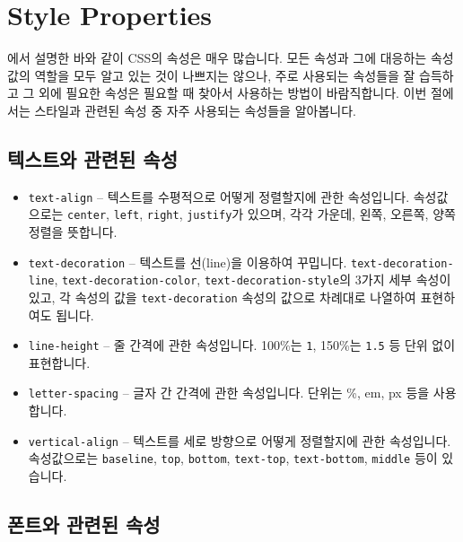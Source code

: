\section{Style Properties} \label{sect:style-properties}

에서 설명한 바와 같이 CSS의 속성은 매우 많습니다. 모든 속성과 그에 대응하는 속성값의 역할을 모두 알고 있는 것이 나쁘지는 않으나, 주로 사용되는 속성들을 잘 습득하고 그 외에 필요한 속성은 필요할 때 찾아서 사용하는 방법이 바람직합니다. 이번 절에서는 스타일과 관련된 속성 중 자주 사용되는 속성들을 알아봅니다. 

\subsection*{텍스트와 관련된 속성}

\begin{itemize}
    \item \verb|text-align| – 텍스트를 수평적으로 어떻게 정렬할지에 관한 속성입니다. 속성값으로는 \verb|center|, \verb|left|, \verb|right|, \verb|justify|가 있으며, 각각 가운데, 왼쪽, 오른쪽, 양쪽 정렬을 뜻합니다. 
    \item \verb|text-decoration| – 텍스트를 선(line)을 이용하여 꾸밉니다. \verb|text-decoration-line|, \verb|text-decoration-color|, \verb|text-decoration-style|의 3가지 세부 속성이 있고, 각 속성의 값을 \verb|text-decoration| 속성의 값으로 차례대로 나열하여 표현하여도 됩니다.	
    \item \verb|line-height| – 줄 간격에 관한 속성입니다. 100\%는 \verb|1|, 150\%는 \verb|1.5| 등 단위 없이 표현합니다. 
    \item \verb|letter-spacing| – 글자 간 간격에 관한 속성입니다. 단위는 \%, em, px 등을 사용합니다. 
    \item \verb|vertical-align| – 텍스트를 세로 방향으로 어떻게 정렬할지에 관한 속성입니다. 속성값으로는 \verb|baseline|, \verb|top|, \verb|bottom|, \verb|text-top|, \verb|text-bottom|, \verb|middle| 등이 있습니다. 
\end{itemize}

\subsection*{폰트와 관련된 속성}

